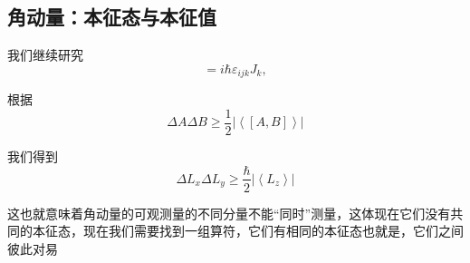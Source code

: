 \subsection{角动量：本征态与本征值}

我们继续研究
\begin{equation}
	[J_{i},J_{j}]=i\hbar\varepsilon_{ijk}J_{k},
	\label{6.17}
\end{equation}

根据
\[
\Delta A\Delta B \ge \frac{1}{2}\left| {\left\langle {\left[ {A,B} \right]} \right\rangle } \right|
\]

我们得到
\[\Delta {L_x}\Delta {L_y} \ge \frac{\hbar }{2}\left| {\left\langle {{L_z}} \right\rangle } \right|\]

这也就意味着角动量的可观测量的不同分量不能“同时”测量，这体现在它们没有共同的本征态，现在我们需要找到一组算符，它们有相同的本征态也就是，它们之间彼此对易

